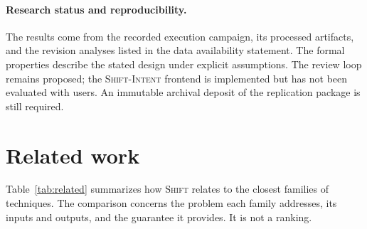 \documentclass[a4paper,fleqn]{cas-sc}
\newcommand{\tool}{\textsc{Shift}}
\newcommand{\dsl}{\textsc{Shift-Intent}}
\begin{document}
\paragraph{Research status and reproducibility.}
The results come from the recorded execution campaign, its processed artifacts, and the revision analyses listed in the data availability statement. The formal properties describe the stated design under explicit assumptions. The review loop remains proposed; the \dsl{} frontend is implemented but has not been evaluated with users. An immutable archival deposit of the replication package is still required.

\section{Related work}\label{sec:related}

Table~\ref{tab:related} summarizes how \tool{} relates to the closest families of techniques. The comparison concerns the problem each family addresses, its inputs and outputs, and the guarantee it provides. It is not a ranking.
\end{document}
